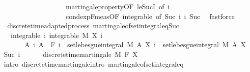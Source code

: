 \begin{isabellebody}
\ \ \ \ \ \ \ \ \ \ \ \ \ \ \ \ \ \ \ martingale{\isacharunderscore}{\kern0pt}property{\isacharbrackleft}{\kern0pt}OF\ le{\isacharunderscore}{\kern0pt}SucI{\isacharcomma}{\kern0pt}\ of\ i{\isacharbrackright}{\kern0pt}\isanewline
\ \ \ \ \ \ \ \ \ \ \ \ \ \ \ \ \ \ \ cond{\isacharunderscore}{\kern0pt}exp{\isacharunderscore}{\kern0pt}F{\isacharunderscore}{\kern0pt}meas{\isacharbrackleft}{\kern0pt}OF\ integrable{\isacharcomma}{\kern0pt}\ of\ {\isachardoublequoteopen}Suc\ i{\isachardoublequoteclose}\ i{\isacharbrackright}{\kern0pt}\ Suc\ \isamarkupfalse%
\ fastforce\isanewline
{}\isamarkupfalse%
%
\endisatagproof
{\isafoldproof}%
%
\isadelimproof
\isanewline
%
\endisadelimproof
\isanewline
{}\isamarkupfalse%
\ {\isacharparenleft}{\kern0pt}\ discrete{\isacharunderscore}{\kern0pt}time{\isacharunderscore}{\kern0pt}adapted{\isacharunderscore}{\kern0pt}process{\isacharparenright}{\kern0pt}\ martingale{\isacharunderscore}{\kern0pt}of{\isacharunderscore}{\kern0pt}set{\isacharunderscore}{\kern0pt}integral{\isacharunderscore}{\kern0pt}eq{\isacharunderscore}{\kern0pt}Suc{\isacharcolon}{\kern0pt}\isanewline
\ \ \ integrable{\isacharcolon}{\kern0pt}\ {\isachardoublequoteopen}{\isasymAnd}i{\isachardot}{\kern0pt}\ integrable\ M\ {\isacharparenleft}{\kern0pt}X\ i{\isacharparenright}{\kern0pt}{\isachardoublequoteclose}\isanewline
\ \ \ \ \ \ \ {\isachardoublequoteopen}{\isasymAnd}A\ i{\isachardot}{\kern0pt}\ A\ {\isasymin}\ F\ i\ {\isasymLongrightarrow}\ set{\isacharunderscore}{\kern0pt}lebesgue{\isacharunderscore}{\kern0pt}integral\ M\ A\ {\isacharparenleft}{\kern0pt}X\ i{\isacharparenright}{\kern0pt}\ {\isacharequal}{\kern0pt}\ set{\isacharunderscore}{\kern0pt}lebesgue{\isacharunderscore}{\kern0pt}integral\ M\ A\ {\isacharparenleft}{\kern0pt}X\ {\isacharparenleft}{\kern0pt}Suc\ i{\isacharparenright}{\kern0pt}{\isacharparenright}{\kern0pt}{\isachardoublequoteclose}\ \isanewline
\ \ \ \ \ {\isachardoublequoteopen}discrete{\isacharunderscore}{\kern0pt}time{\isacharunderscore}{\kern0pt}martingale\ M\ F\ X{\isachardoublequoteclose}\isanewline
%
\isadelimproof
%
\endisadelimproof
%
\isatagproof
{}\isamarkupfalse%
\ {\isacharparenleft}{\kern0pt}intro\ discrete{\isacharunderscore}{\kern0pt}time{\isacharunderscore}{\kern0pt}martingale{\isachardot}{\kern0pt}intro\ martingale{\isacharunderscore}{\kern0pt}of{\isacharunderscore}{\kern0pt}set{\isacharunderscore}{\kern0pt}integral{\isacharunderscore}{\kern0pt}eq{\isacharparenright}{\kern0pt}\isanewline
\ \ \isamarkupfalse%

\end{isabellebody}
